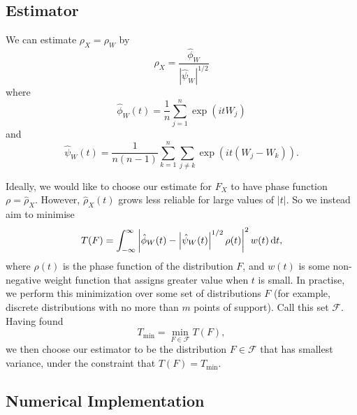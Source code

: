 	\subsection{Estimator}
	We can estimate $\rho_X = \rho_W$ by
	\begin{equation}
		\hat{\rho}_X = \frac{\hat{\phi}_W}{\left|\hat{\psi}_W\right|^{1/2}}
	\end{equation}
	where
	\begin{equation}
	\label{eq:define hat phi W}
		\hat{\phi}_W(t) = \frac{1}{n}\sum_{j = 1}^n \exp(it W_j)
	\end{equation}
	and 
	\begin{equation}
	\label{eq:define hat psi W}
		\hat{\psi}_W(t) = \frac{1}{n(n-1)} \sum_{k=1}^n \sum_{j \neq k} \exp(it (W_j - W_k)).
	\end{equation}

	Ideally, we would like to choose our estimate for $F_X$ to have phase function $\rho = \hat{\rho}_X$. However, $\hat{\rho}_X(t)$ grows less reliable for large values of $|t|$. So we instead aim to minimise 
	\begin{equation}
		T(F) = \int_{-\infty}^\infty \left| \hat{\phi}_W(t) - \left|\hat{\psi}_W(t)\right|^{1/2} \rho(t) \right|^2 w(t) \, \mathrm{d} t,
	\end{equation}
	where $\rho(t)$ is the phase function of the distribution $F$, and $w(t)$ is some non-negative weight function that assigns greater value when $t$ is small. In practise, we perform this minimization over some set of distributions $F$ (for example, discrete distributions with no more than $m$ points of support). Call this set $\mathscr{F}$. Having found
	\begin{equation}
		T_\mathrm{min} = \min_{F \in \mathscr{F}} T(F),
	\end{equation}
	we then choose our estimator to be the distribution $F \in \mathscr{F}$ that has smallest variance, under the constraint that $T(F) = T_\mathrm{min}$.

	\subsection{Numerical Implementation}

